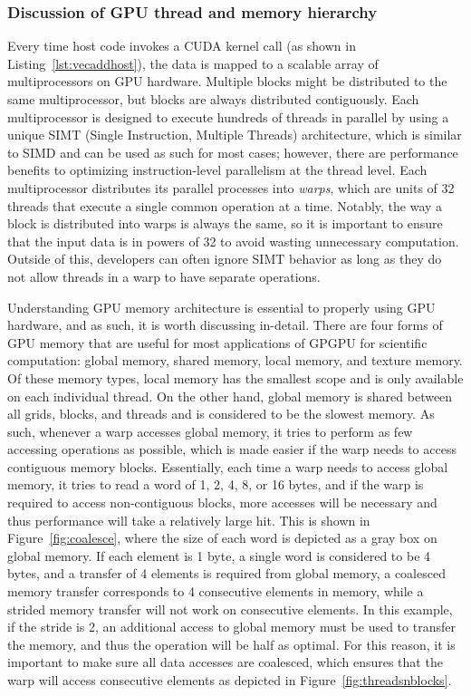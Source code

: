 \subsubsection{Discussion of GPU thread and memory hierarchy}

Every time host code invokes a CUDA kernel call (as shown in Listing~\ref{lst:vecaddhost}), the data is mapped to a scalable array of multiprocessors on GPU hardware.
Multiple blocks might be distributed to the same multiprocessor, but blocks are always distributed contiguously.
Each multiprocessor is designed to execute hundreds of threads in parallel by using a unique SIMT (Single Instruction, Multiple Threads) architecture, which is similar to SIMD and can be used as such for most cases; however, there are performance benefits to optimizing instruction-level parallelism at the thread level.
Each multiprocessor distributes its parallel processes into \textit{warps}, which are units of 32 threads that execute a single common operation at a time.
Notably, the way a block is distributed into warps is always the same, so it is important to ensure that the input data is in powers of 32 to avoid wasting unnecessary computation.
Outside of this, developers can often ignore SIMT behavior as long as they do not allow threads in a warp to have separate operations.

Understanding GPU memory architecture is essential to properly using GPU hardware, and as such, it is worth discussing in-detail.
There are four forms of GPU memory that are useful for most applications of GPGPU for scientific computation: global memory, shared memory, local memory, and texture memory.
Of these memory types, local memory has the smallest scope and is only available on each individual thread.
On the other hand, global memory is shared between all grids, blocks, and threads and is considered to be the slowest memory.
As such, whenever a warp accesses global memory, it tries to perform as few accessing operations as possible, which is made easier if the warp needs to access contiguous memory blocks.
Essentially, each time a warp needs to access global memory, it tries to read a word of 1, 2, 4, 8, or 16 bytes, and
if the warp is required to access non-contiguous blocks, more accesses will be necessary and thus performance will take a relatively large hit.
This is shown in Figure~\ref{fig:coalesce}, where the size of each word is depicted as a gray box on global memory.
If each element is 1 byte, a single word is considered to be 4 bytes, and a transfer of 4 elements is required from global memory, a coalesced memory transfer corresponds to 4 consecutive elements in memory, while a strided memory transfer will not work on consecutive elements.
In this example, if the stride is 2, an additional access to global memory must be used to transfer the memory, and thus the operation will be half as optimal.
For this reason, it is important to make sure all data accesses are coalesced, which ensures that the warp will access consecutive elements as depicted in Figure~\ref{fig:threadsnblocks}.

